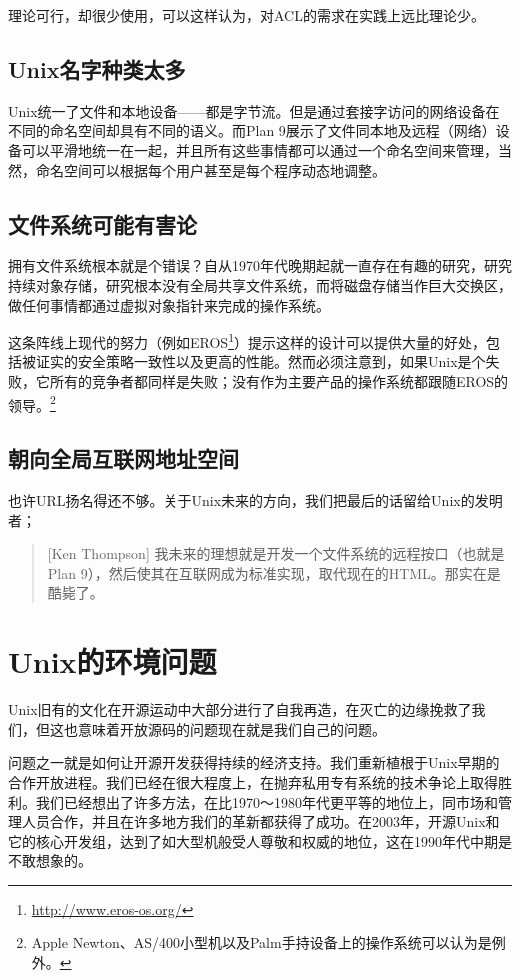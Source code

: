 \documentclass[12pt,oneside]{book}
\begin{document}
理论可行，却很少使用，可以这样认为，对ACL的需求在实践上远比理论少。

\subsection{Unix名字种类太多}
Unix统一了文件和本地设备——都是字节流。但是通过套接字访问的网络设备在不同的命名空间却具有不同的语义。而Plan 9展示了文件同本地及远程（网络）设备可以平滑地统一在一起，并且所有这些事情都可以通过一个命名空间来管理，当然，命名空间可以根据每个用户甚至是每个程序动态地调整。

\subsection{文件系统可能有害论}
拥有文件系统根本就是个错误？自从1970年代晚期起就一直存在有趣的研究，研究持续对象存储，研究根本没有全局共享文件系统，而将磁盘存储当作巨大交换区，做任何事情都通过虚拟对象指针来完成的操作系统。

这条阵线上现代的努力（例如EROS\footnote{\href{http://www.eros-os.org/}{http://www.eros-os.org/}}）提示这样的设计可以提供大量的好处，包括被证实的安全策略一致性以及更高的性能。然而必须注意到，如果Unix是个失败，它所有的竞争者都同样是失败；没有作为主要产品的操作系统都跟随EROS的领导。\footnote{Apple Newton、AS/400小型机以及Palm手持设备上的操作系统可以认为是例外。}

\subsection{朝向全局互联网地址空间}
也许URL扬名得还不够。关于Unix未来的方向，我们把最后的话留给Unix的发明者；
\begin{quote}[Ken Thompson]
我未来的理想就是开发一个文件系统的远程按口（也就是Plan 9），然后使其在互联网成为标准实现，取代现在的HTML。那实在是酷毙了。
\end{quote}

\section{Unix的环境问题}
Unix旧有的文化在开源运动中大部分进行了自我再造，在灭亡的边缘挽救了我们，但这也意味着开放源码的问题现在就是我们自己的问题。

问题之一就是如何让开源开发获得持续的经济支持。我们重新植根于Unix早期的合作开放进程。我们已经在很大程度上，在抛弃私用专有系统的技术争论上取得胜利。我们已经想出了许多方法，在比1970～1980年代更平等的地位上，同市场和管理人员合作，并且在许多地方我们的革新都获得了成功。在2003年，开源Unix和它的核心开发组，达到了如大型机般受人尊敬和权威的地位，这在1990年代中期是不敢想象的。
\end{document}
